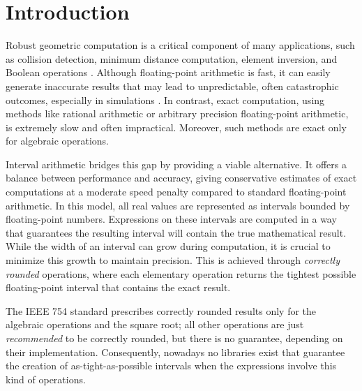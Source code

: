 
\section{Introduction}
\label{sec:introduction}
Robust geometric computation is a critical component of many applications, such as collision detection, minimum distance computation, element inversion, and Boolean operations \cite{something}. Although floating-point arithmetic is fast, it can easily generate inaccurate results that may lead to unpredictable, often catastrophic outcomes, especially in simulations \cite{something}. In contrast, exact computation, using methods like rational arithmetic or arbitrary precision floating-point arithmetic, is extremely slow and often impractical.
Moreover, such methods are exact only for algebraic operations. 

Interval arithmetic bridges this gap by providing a viable alternative. 
It offers a balance between performance and accuracy, giving conservative estimates of exact computations at a moderate speed penalty compared to standard floating-point arithmetic. In this model, all real values are represented as intervals bounded by floating-point numbers. Expressions on these intervals are computed in a way that guarantees the resulting interval will contain the true mathematical result.
While the width of an interval can grow during computation, it is crucial to minimize this growth to maintain precision. This is achieved through \emph{correctly rounded} operations, where each elementary operation returns the tightest possible floating-point interval that contains the exact result.

The IEEE 754 standard prescribes correctly rounded results only for the algebraic operations and the square root; all other 
operations are just \emph{recommended} to be correctly rounded, but there is no guarantee, depending on their implementation.
Consequently, nowadays no libraries exist that guarantee the creation of as-tight-as-possible intervals when the expressions involve this kind of operations.

